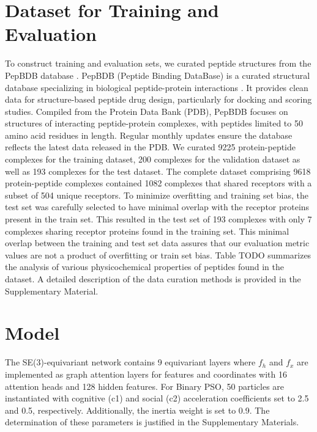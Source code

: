 \section{Dataset for Training and Evaluation}
To construct training and evaluation sets, we curated peptide structures from the PepBDB database \cite{Wen2019}. PepBDB (Peptide Binding DataBase) is a curated structural database specializing in biological peptide-protein interactions \cite{Wen2019}. It provides clean data for structure-based peptide drug design, particularly for docking and scoring studies. Compiled from the Protein Data Bank (PDB), PepBDB focuses on structures of interacting peptide-protein complexes, with peptides limited to 50 amino acid residues in length. Regular monthly updates ensure the database reflects the latest data released in the PDB.
We curated 9225 protein-peptide complexes for the training dataset, 200 complexes for the validation dataset as well as 193 complexes for the test dataset. The complete dataset comprising 9618 protein-peptide complexes contained 1082 complexes that shared receptors with a subset of 504 unique receptors. To minimize overfitting and training set bias, the test set was carefully selected to have minimal overlap with the receptor proteins present in the train set. This resulted in the test set of 193 complexes with only 7 complexes sharing receptor proteins found in the training set. This minimal overlap between the training and test set data assures that our evaluation metric values are not a product of overfitting or train set bias. Table TODO summarizes the analysis of various physicochemical properties of peptides found in the dataset. A detailed description of the data curation methods is provided in the Supplementary Material.

\section{Model} %
The SE(3)-equivariant network contains 9 equivariant layers where $f_h$ and $f_x$ are implemented as graph attention layers for features and coordinates with 16 attention heads and 128 hidden features. For Binary PSO, 50 particles are instantiated with cognitive (c1) and social (c2) acceleration coefficients set to 2.5 and 0.5, respectively. Additionally, the inertia weight is set to 0.9.
The determination of these parameters is justified in the Supplementary Materials.

